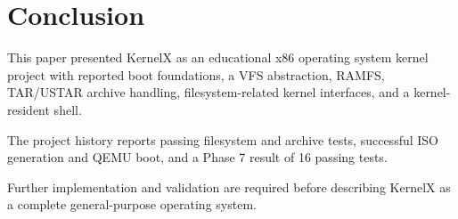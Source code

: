 \documentclass[conference]{IEEEtran}
\begin{document}
\section{Conclusion}

This paper presented KernelX as an educational x86 operating
system kernel project with reported boot foundations, a VFS
abstraction, RAMFS, TAR/USTAR archive handling, filesystem-related
kernel interfaces, and a kernel-resident shell.

The project history reports passing filesystem and archive
tests, successful ISO generation and QEMU boot, and a Phase 7
result of 16 passing tests.

Further implementation and validation are required before
describing KernelX as a complete general-purpose operating system.
\end{document}
